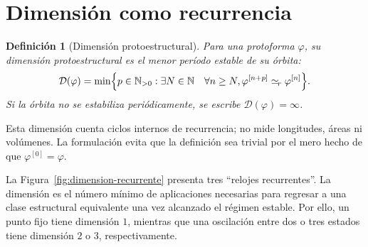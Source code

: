 \documentclass[11pt]{article}
\numberwithin{equation}{section}
\theoremstyle{prism}
\newtheorem{definicion}{Definición}
\newcommand{\N}{\mathbb{N}}
\newcommand{\iter}[2]{#1^{[#2]}}
\newcommand{\peq}{\simeq_{\!r}}
\begin{document}
\FloatBarrier
\section{Dimensión como recurrencia}

\begin{definicion}[Dimensión protoestructural]
Para una protoforma $\varphi$, su dimensión protoestructural es el menor
período estable de su órbita:
\begin{equation}
  \mathcal{D}(\varphi)
  =\min\Bigl\{p\in\N_{>0}:\exists N\in\N\quad
  \forall n\geq N,
  \iter{\varphi}{n+p}\peq\iter{\varphi}{n}\Bigr\}.
  \label{eq:dimension}
\end{equation}
Si la órbita no se estabiliza periódicamente, se escribe
$\mathcal{D}(\varphi)=\infty$.
\end{definicion}

Esta dimensión cuenta ciclos internos de recurrencia; no mide longitudes,
áreas ni volúmenes. La formulación evita que la definición sea trivial por el
mero hecho de que $\iter{\varphi}{0}=\varphi$.

La Figura~\ref{fig:dimension-recurrente} presenta tres ``relojes recurrentes''.
La dimensión es el número mínimo de aplicaciones necesarias para regresar a
una clase estructural equivalente una vez alcanzado el régimen estable. Por
ello, un punto fijo tiene dimensión $1$, mientras que una oscilación entre dos o
tres estados tiene dimensión $2$ o $3$, respectivamente.
\end{document}
